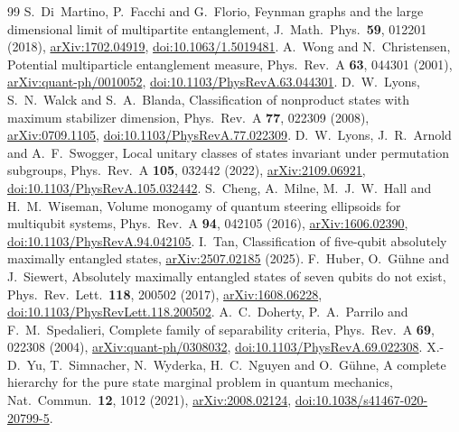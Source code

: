 \documentclass[11pt]{article}
\begin{document}
\begin{thebibliography}{99}
 S.~Di~Martino, P.~Facchi and G.~Florio, Feynman graphs and the large dimensional limit
of multipartite entanglement, J.\ Math.\ Phys.\ \textbf{59}, 012201 (2018),
\href{https://arxiv.org/abs/1702.04919}{arXiv:1702.04919}, \href{https://doi.org/10.1063/1.5019481}{doi:10.1063/1.5019481}.
 A.~Wong and N.~Christensen, Potential multiparticle entanglement measure, Phys.\ Rev.\ A
\textbf{63}, 044301 (2001), \href{https://arxiv.org/abs/quant-ph/0010052}{arXiv:quant-ph/0010052}, \href{https://doi.org/10.1103/PhysRevA.63.044301}{doi:10.1103/PhysRevA.63.044301}.
 D.~W.~Lyons, S.~N.~Walck and S.~A.~Blanda, Classification of nonproduct states with
maximum stabilizer dimension, Phys.\ Rev.\ A \textbf{77}, 022309 (2008),
\href{https://arxiv.org/abs/0709.1105}{arXiv:0709.1105}, \href{https://doi.org/10.1103/PhysRevA.77.022309}{doi:10.1103/PhysRevA.77.022309}.
 D.~W.~Lyons, J.~R.~Arnold and A.~F.~Swogger, Local unitary classes of states
invariant under permutation subgroups, Phys.\ Rev.\ A \textbf{105}, 032442 (2022),
\href{https://arxiv.org/abs/2109.06921}{arXiv:2109.06921}, \href{https://doi.org/10.1103/PhysRevA.105.032442}{doi:10.1103/PhysRevA.105.032442}.
 S.~Cheng, A.~Milne, M.~J.~W.~Hall and H.~M.~Wiseman, Volume monogamy of quantum
steering ellipsoids for multiqubit systems, Phys.\ Rev.\ A \textbf{94}, 042105 (2016),
\href{https://arxiv.org/abs/1606.02390}{arXiv:1606.02390}, \href{https://doi.org/10.1103/PhysRevA.94.042105}{doi:10.1103/PhysRevA.94.042105}.
 I.~Tan, Classification of five-qubit absolutely maximally
entangled states, \href{https://arxiv.org/abs/2507.02185}{arXiv:2507.02185} (2025).
 F.~Huber, O.~G\"uhne and J.~Siewert, Absolutely maximally entangled states of seven
qubits do not exist, Phys.\ Rev.\ Lett.\ \textbf{118}, 200502 (2017),
\href{https://arxiv.org/abs/1608.06228}{arXiv:1608.06228}, \href{https://doi.org/10.1103/PhysRevLett.118.200502}{doi:10.1103/PhysRevLett.118.200502}.
 A.~C.~Doherty, P.~A.~Parrilo and F.~M.~Spedalieri, Complete family of separability criteria,
Phys.\ Rev.\ A \textbf{69}, 022308 (2004), \href{https://arxiv.org/abs/quant-ph/0308032}{arXiv:quant-ph/0308032}, \href{https://doi.org/10.1103/PhysRevA.69.022308}{doi:10.1103/PhysRevA.69.022308}.
 X.-D.~Yu, T.~Simnacher, N.~Wyderka, H.~C.~Nguyen and O.~G\"uhne, A complete hierarchy for the pure
state marginal problem in quantum mechanics, Nat.\ Commun.\ \textbf{12}, 1012 (2021),
\href{https://arxiv.org/abs/2008.02124}{arXiv:2008.02124}, \href{https://doi.org/10.1038/s41467-020-20799-5}{doi:10.1038/s41467-020-20799-5}.

\end{thebibliography}
\end{document}
